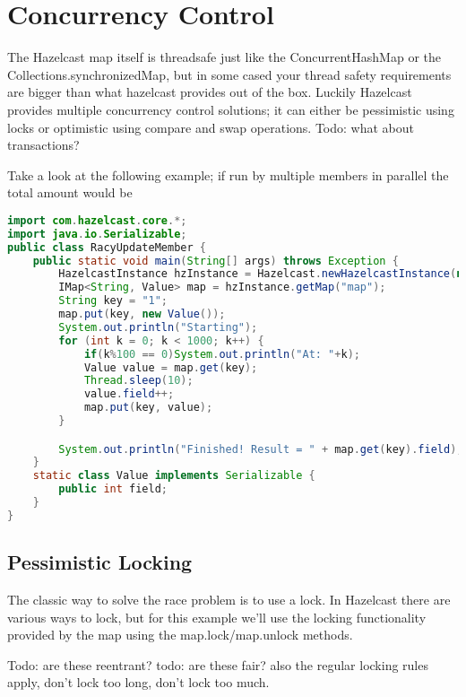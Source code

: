 \section{Concurrency Control}
The Hazelcast map itself is threadsafe just like the ConcurrentHashMap or the Collections.synchronizedMap, but in some cased your thread safety requirements are bigger than what hazelcast provides out of the box. Luckily Hazelcast provides multiple concurrency control solutions;  it can either be pessimistic using locks or optimistic using compare and swap operations. Todo: what about transactions?

Take a look at the following example; if run by multiple members in parallel the total amount would be 
\begin{lstlisting}[language=java]
import com.hazelcast.core.*;
import java.io.Serializable;
public class RacyUpdateMember {
    public static void main(String[] args) throws Exception {
        HazelcastInstance hzInstance = Hazelcast.newHazelcastInstance(null);
        IMap<String, Value> map = hzInstance.getMap("map");
        String key = "1";
        map.put(key, new Value());
        System.out.println("Starting");
        for (int k = 0; k < 1000; k++) {
            if(k%100 == 0)System.out.println("At: "+k);
            Value value = map.get(key);
            Thread.sleep(10);
            value.field++;
            map.put(key, value);
        }

        System.out.println("Finished! Result = " + map.get(key).field);
    }
    static class Value implements Serializable {
        public int field;
    }
}
\end{lstlisting}

\subsection{Pessimistic Locking}
The classic way to solve the race problem is to use a lock. In Hazelcast there are various ways to lock, but for this example we'll use the locking functionality provided by the map using the map.lock/map.unlock methods.

Todo: are these reentrant?
todo: are these fair?
also the regular locking rules apply, don't lock too long, don't lock too much.

